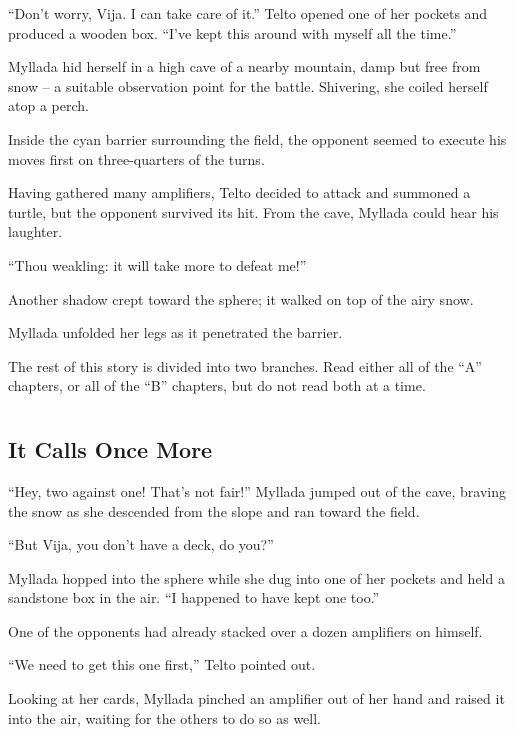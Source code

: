 ``Don't worry, Vija. I can take care of it.'' Telto opened one of her pockets and produced a wooden box. ``I've kept this around with myself all the time.''

Myllada hid herself in a high cave of a nearby mountain, damp but free from snow -- a suitable observation point for the battle. Shivering, she coiled herself atop a perch.

Inside the cyan barrier surrounding the field, the opponent seemed to execute his moves first on three-quarters of the turns.

Having gathered many amplifiers, Telto decided to attack and summoned a turtle, but the opponent survived its hit. From the cave, Myllada could hear his laughter.

``Thou weakling: it will take more to defeat me!''

Another shadow crept toward the sphere; it walked on top of the airy snow.

Myllada unfolded her legs as it penetrated the barrier.

The rest of this story is divided into two branches. Read either all of the ``A'' chapters, or all of the ``B'' chapters, but do not read both at a time.

\hidechapters

\chapter{}

\section{It Calls Once More}

``Hey, two against one! That's not fair!'' Myllada jumped out of the cave, braving the snow as she descended from the slope and ran toward the field.

``But Vija, you don't have a deck, do you?''

Myllada hopped into the sphere while she dug into one of her pockets and held a sandstone box in the air. ``I happened to have kept one too.''

One of the opponents had already stacked over a dozen amplifiers on himself.

``We need to get this one first,'' Telto pointed out.

Looking at her cards, Myllada pinched an amplifier out of her hand and raised it into the air, waiting for the others to do so as well.

